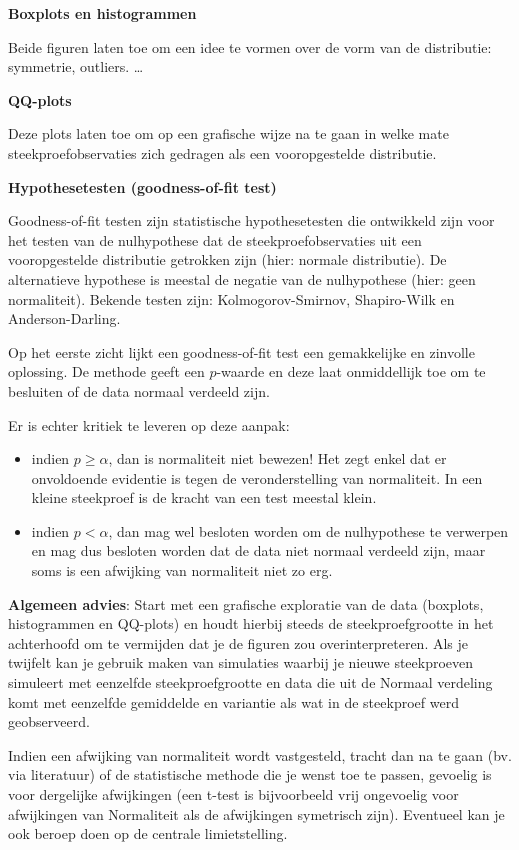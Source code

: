 \documentclass[
  12pt,dutch,coursenotes]{book}
\providecommand{\tightlist}{%
  \setlength{\itemsep}{0pt}\setlength{\parskip}{0pt}}
\theoremstyle{definition}
\theoremstyle{definition}
\theoremstyle{definition}
\theoremstyle{remark}
\begin{document}
\textbf{Boxplots en histogrammen}

Beide figuren laten toe om een idee te vormen over de vorm van de distributie: symmetrie, outliers. \ldots

\textbf{QQ-plots}

Deze plots laten toe om op een grafische wijze na te gaan in welke mate steekproefobservaties zich gedragen als een vooropgestelde distributie.

\textbf{Hypothesetesten (goodness-of-fit test)}

Goodness-of-fit testen zijn statistische hypothesetesten die ontwikkeld zijn voor het testen van de nulhypothese dat de steekproefobservaties uit een vooropgestelde distributie getrokken zijn (hier: normale distributie). De alternatieve hypothese is meestal de negatie van de nulhypothese (hier: geen normaliteit). Bekende testen zijn: Kolmogorov-Smirnov, Shapiro-Wilk en Anderson-Darling.

Op het eerste zicht lijkt een goodness-of-fit test een gemakkelijke en zinvolle oplossing. De methode geeft een \(p\)-waarde en deze laat onmiddellijk toe om te besluiten of de data normaal verdeeld zijn.

Er is echter kritiek te leveren op deze aanpak:

\begin{itemize}
\tightlist
\item
  indien \(p\geq \alpha\), dan is normaliteit niet bewezen! Het zegt enkel dat er onvoldoende evidentie is tegen de veronderstelling van normaliteit. In een kleine steekproef is de kracht van een test meestal klein.
\item
  indien \(p<\alpha\), dan mag wel besloten worden om de nulhypothese te verwerpen en mag dus besloten worden dat de data niet normaal verdeeld zijn, maar soms is een afwijking van normaliteit niet zo erg.
\end{itemize}

\textbf{Algemeen advies}:
Start met een grafische exploratie van de data (boxplots, histogrammen en QQ-plots) en houdt hierbij steeds de steekproefgrootte in het achterhoofd om te vermijden dat je de figuren zou overinterpreteren. Als je twijfelt kan je gebruik maken van simulaties waarbij je nieuwe steekproeven simuleert met eenzelfde steekproefgrootte en data die uit de Normaal verdeling komt met eenzelfde gemiddelde en variantie als wat in de steekproef werd geobserveerd.

Indien een afwijking van normaliteit wordt vastgesteld, tracht dan na te gaan (bv. via literatuur) of de statistische methode die je wenst toe te passen, gevoelig is voor dergelijke afwijkingen (een t-test is bijvoorbeeld vrij ongevoelig voor afwijkingen van Normaliteit als de afwijkingen symetrisch zijn). Eventueel kan je ook beroep doen op de centrale limietstelling.
\end{document}
